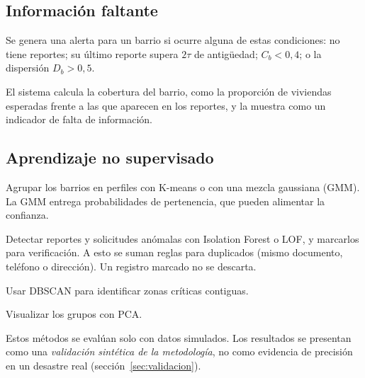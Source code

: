 \subsection{Información faltante}
\begin{description}[leftmargin=0pt]
  \item[RM-12 (\Must).] Se genera una alerta para un barrio si ocurre alguna de estas condiciones: no tiene reportes; su último reporte supera $2\tau$ de antigüedad; $C_b<0{,}4$; o la dispersión $D_b>0{,}5$.
  \item[RM-13 (\Should).] El sistema calcula la cobertura del barrio, como la proporción de viviendas esperadas frente a las que aparecen en los reportes, y la muestra como un indicador de falta de información.
\end{description}

\subsection{Aprendizaje no supervisado}
\begin{description}[leftmargin=0pt]
  \item[RM-14 (\Could).] Agrupar los barrios en perfiles con K-means o con una mezcla gaussiana (GMM). La GMM entrega probabilidades de pertenencia, que pueden alimentar la confianza.
  \item[RM-15 (\Should).] Detectar reportes y solicitudes anómalas con Isolation Forest o LOF, y marcarlos para verificación. A esto se suman reglas para duplicados (mismo documento, teléfono o dirección). Un registro marcado no se descarta.
  \item[RM-16 (\Could).] Usar DBSCAN para identificar zonas críticas contiguas.
  \item[RM-17 (\Could).] Visualizar los grupos con PCA.
\end{description}
Estos métodos se evalúan solo con datos simulados. Los resultados se presentan como una \emph{validación sintética de la metodología}, no como evidencia de precisión en un desastre real (sección~\ref{sec:validacion}).

